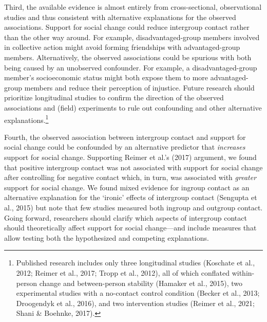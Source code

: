 \documentclass[12pt, letterpaper]{article}
\begin{document}
Third, the available evidence is almost entirely from cross-sectional,
observational studies and thus consistent with alternative explanations
for the observed associations. Support for social change could reduce
intergroup contact rather than the other way around. For example,
disadvantaged-group members involved in collective action might avoid
forming friendships with advantaged-group members. Alternatively, the
observed associations could be spurious with both being caused by an
unobserved confounder. For example, a disadvantaged-group member's
socioeconomic status might both expose them to more advantaged-group
members and reduce their perception of injustice. Future research should
prioritize longitudinal studies to confirm the direction of the observed
associations and (field) experiments to rule out confounding and other
alternative explanations.\footnote{Published research includes only
  three longitudinal studies (Koschate et al., 2012; Reimer et al.,
  2017; Tropp et al., 2012), all of which conflated within-person change
  and between-person stability (Hamaker et al., 2015), two experimental
  studies with a no-contact control condition (Becker et al., 2013;
  Droogendyk et al., 2016), and two intervention studies (Reimer et al.,
  2021; Shani \& Boehnke, 2017).}

Fourth, the observed association between intergroup contact and support
for social change could be confounded by an alternative predictor that
\emph{increases} support for social change. Supporting Reimer et al.'s
(2017) argument, we found that positive intergroup contact was not
associated with support for social change after controlling for negative
contact which, in turn, was associated with \emph{greater} support for
social change. We found mixed evidence for ingroup contact as an
alternative explanation for the `ironic' effects of intergroup contact
(Sengupta et al., 2015) but note that few studies measured both ingroup
and outgroup contact. Going forward, researchers should clarify which
aspects of intergroup contact should theoretically affect support for
social change---and include measures that allow testing both the
hypothesized and competing explanations.
\end{document}

